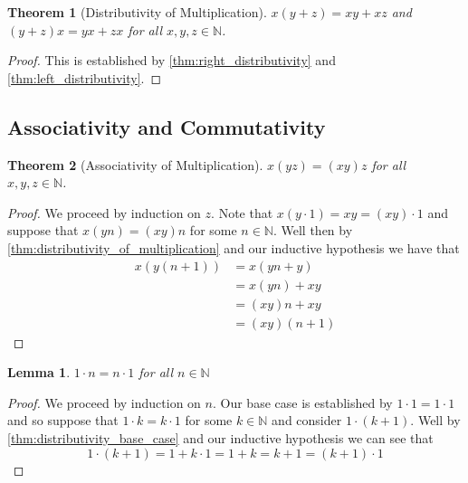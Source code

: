 \documentclass{article}
\theoremstyle{definition}
\theoremstyle{definition}
\theoremstyle{plain}
\theoremstyle{remark}
\theoremstyle{plain}
\newtheorem{theorem}{Theorem}[section]
\theoremstyle{remark}
\theoremstyle{plain}
\newtheorem{lemma}{Lemma}[section]
\theoremstyle{plain}
\theoremstyle{plain}
\theoremstyle{plain}
\begin{document}
\begin{theorem}[Distributivity of Multiplication]
  \(x(y + z) = xy + xz \) and \( (y+z)x = yx + zx \) for all 
  \( x, y, z \in \mathbb{N} \). 
  \label{thm:distributivity_of_multiplication}
\end{theorem}

\begin{proof}
  This is established by \autoref{thm:right_distributivity} and
  \autoref{thm:left_distributivity}. 
\end{proof}

\subsection{Associativity and Commutativity}


\begin{theorem}[Associativity of Multiplication]
   \(x(yz) = (xy)z\) for all \( x, y, z \in \mathbb{N} \). 
\end{theorem}

\begin{proof}
  We proceed by induction on \( z \). Note that 
  \( x(y \cdot 1 ) = xy = (x y) \cdot 1 \) and suppose that 
  \( x(yn) = (xy)n \) for some \( n \in \mathbb{N}  \). Well then 
  by \autoref{thm:distributivity_of_multiplication} and our inductive hypothesis
  we have that
  \begin{align*}
    x(y(n+1)) &= x(yn+y) \\
              &= x(yn) + xy \\
              &= (xy)n + xy \\
              &= (xy)(n+1)
  \end{align*}
\end{proof}

\begin{lemma}
  \( 1 \cdot n = n \cdot 1 \) for all \( n \in \mathbb{N} \)
  \label{thm:commutativity_lemma}
\end{lemma}

\begin{proof}
  We proceed by induction on \( n \). Our base case is established by 
  \( 1 \cdot 1 = 1 \cdot 1\) and so suppose that \( 1 \cdot k = k \cdot 1 \)  
  for some \( k \in \mathbb{N} \) and
  consider \( 1 \cdot (k + 1) \). Well by \autoref{thm:distributivity_base_case}
  and our inductive hypothesis we can see that 
  \[ 1 \cdot (k + 1) = 1 + k \cdot 1 = 1 + k = k + 1 = (k + 1) \cdot 1 \]
\end{proof}
\end{document}
